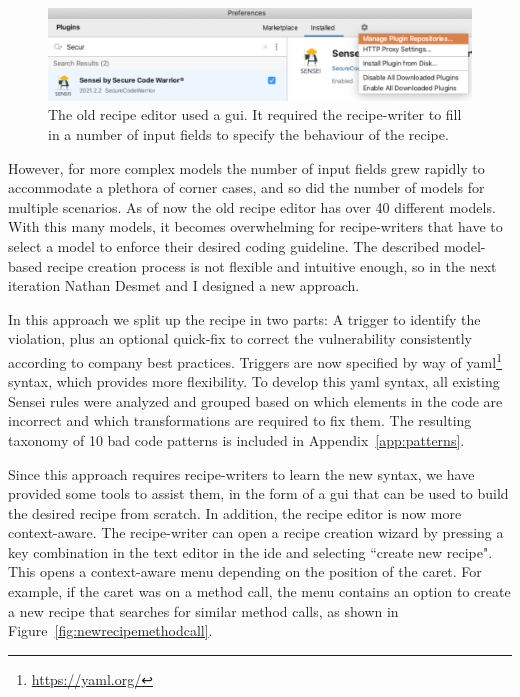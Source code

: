 \begin{figure}
  \centering
  \includegraphics[width=\textwidth,page=7]{04-tools/figures/figures2.pdf}
  \caption[Old model-based recipe editor]{The old recipe editor used a \gls{gui}. It required the recipe-writer to fill in a number of input fields to specify the behaviour of the recipe.}
  \label{fig:recipeedit2} 
\end{figure}

However, for more complex models the number of input fields grew rapidly to accommodate a plethora of corner cases, and so did the number of models for multiple scenarios.
As of now the old recipe editor has over 40 different models.
With this many models, it becomes overwhelming for recipe-writers that have to select a model to enforce their desired coding guideline.
The described model-based recipe creation process is not flexible and intuitive enough, so in the next iteration Nathan Desmet and I designed a new approach.

In this approach we split up the recipe in two parts: A trigger to identify the violation, plus an optional quick-fix to correct the vulnerability consistently according to company best practices.
Triggers are now specified by way of \gls{yaml}\footnote{\url{https://yaml.org/}} syntax, which provides more flexibility.
To develop this \gls{yaml} syntax, all existing Sensei rules were analyzed and grouped based on which elements in the code are incorrect and which transformations are required to fix them.
The resulting taxonomy of 10 bad code patterns is included in Appendix~\ref{app:patterns}.

Since this approach requires recipe-writers to learn the new syntax, we have provided some tools to assist them, in the form of a \gls{gui} that can be used to build the desired recipe from scratch.
In addition, the recipe editor is now more context-aware.
The recipe-writer can open a recipe creation wizard by pressing a key combination in the text editor in the \gls{ide} and selecting ``create new recipe".
This opens a context-aware menu depending on the position of the caret.
For example, if the caret was on a method call, the menu contains an option to create a new recipe that searches for similar method calls, as shown in Figure~\ref{fig:newrecipemethodcall}.

